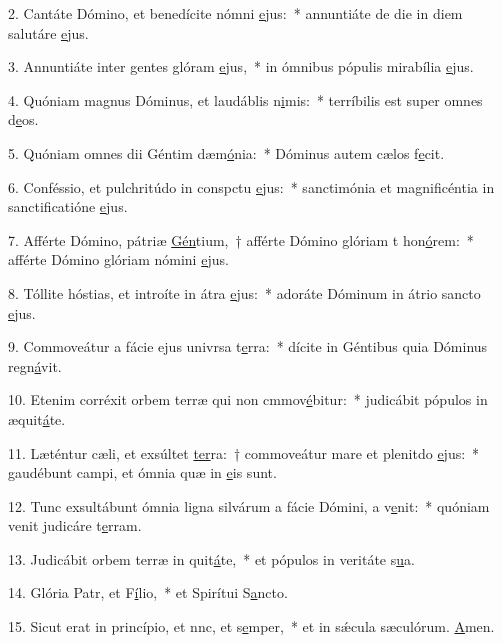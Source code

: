 2. Cantáte Dómino, et benedícite nómni \uline{e}jus:~* annuntiáte de die in diem salutáre \uline{e}jus.\par 
3. Annuntiáte inter gentes glóram \uline{e}jus,~* in ómnibus pópulis mirabília \uline{e}jus.\par 
4. Quóniam magnus Dóminus, et laudáblis n\uline{i}mis:~* terríbilis est super omnes d\uline{e}os.\par 
5. Quóniam omnes dii Géntim dæm\uline{ó}nia:~* Dóminus autem cælos f\uline{e}cit.\par 
6. Conféssio, et pulchritúdo in conspctu \uline{e}jus:~* sanctimónia et magnificéntia in sanctificatióne \uline{e}jus.\par 
7. Afférte Dómino, pátriæ \uline{Gén}tium,~† afférte Dómino glóriam t hon\uline{ó}rem:~* afférte Dómino glóriam nómini \uline{e}jus.\par 
8. Tóllite hóstias, et introíte in átra \uline{e}jus:~* adoráte Dóminum in átrio sancto \uline{e}jus.\par 
9. Commoveátur a fácie ejus univrsa t\uline{e}rra:~* dícite in Géntibus quia Dóminus regn\uline{á}vit.\par 
10. Etenim corréxit orbem terræ qui non cmmov\uline{é}bitur:~* judicábit pópulos in æquit\uline{á}te.\par 
11. Læténtur cæli, et exsúltet \uline{ter}ra:~† commoveátur mare et plenitdo \uline{e}jus:~* gaudébunt campi, et ómnia quæ in \uline{e}is sunt.\par 
12. Tunc exsultábunt ómnia ligna silvárum a fácie Dómini, a v\uline{e}nit:~* quóniam venit judicáre t\uline{e}rram.\par 
13. Judicábit orbem terræ in quit\uline{á}te,~* et pópulos in veritáte s\uline{u}a.\par 
14. Glória Patr, et F\uline{í}lio,~* et Spirítui S\uline{a}ncto.\par 
15. Sicut erat in princípio, et nnc, et s\uline{e}mper,~* et in sǽcula sæculórum. \uline{A}men.\par 
